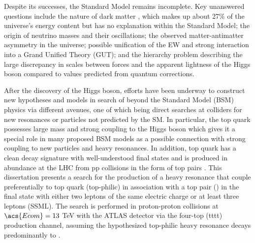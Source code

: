 \documentclass[../thesis.tex]{subfiles}
\begin{document}
Despite its successes, the Standard Model remains incomplete. Key unanswered questions include the nature of dark matter \citep{PDG}, which makes up about 27\% of the universe’s energy content but has no explanation within the Standard Model; the origin of neutrino masses and their oscillations; the observed matter-antimatter asymmetry in the universe; possible unification of the \acs{EW} and strong interaction into a Grand Unified Theory (\acs{GUT}); and the hierarchy problem describing the large discrepancy in scales between forces and the apparent lightness of the Higgs boson compared to values predicted from quantum corrections. 

After the discovery of the Higgs boson, efforts have been underway to construct new hypotheses and models in search of beyond the Standard Model (\acs{BSM}) physics via different avenues, one of which being direct searches at colliders for new resonances or particles not predicted by the \acs{SM}. In particular, the top quark possesses large mass and strong coupling to the Higgs boson \citep{theory:top_coupling} which gives it a special role in many proposed \acs{BSM} models as a possible connection with strong coupling to new particles and heavy resonances. In addition, top quark has a clean decay signature with well-understood final states and is produced in abundance at the \acs{LHC} from \acs{pp} collisions in the form of top pairs \ttbar \citep{TOPQ-2018-39,Degrande_2011}. This dissertation presents a search for the production of a heavy resonance that couple preferentially to top quark (top-philic) in association with a top pair (\ttbar) in the final state with either two leptons of the same electric charge or at least three leptons (\acs{SSML}). The search is performed in proton-proton collisions at $\acs{Ecom}=13$ TeV with the \acs{ATLAS} detector \citep{atlas} via the four-top (\acs{tttt}) production channel, assuming the hypothesized top-philic heavy resonance decays predominantly to \ttbar.
\end{document}
